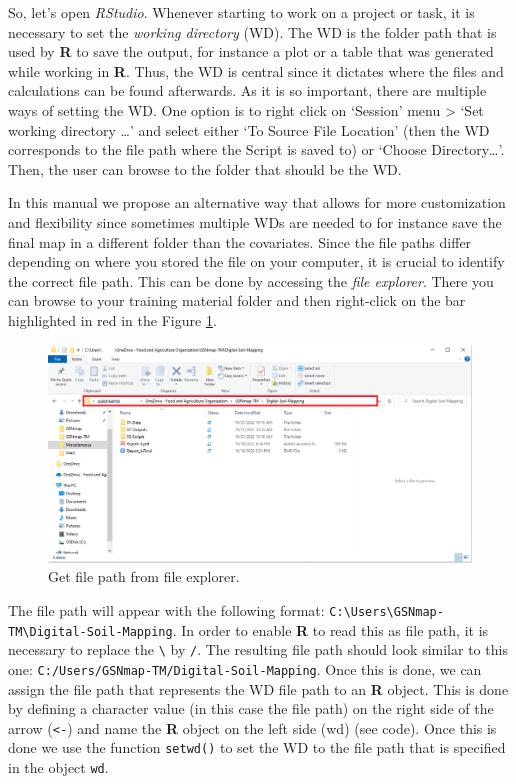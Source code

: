 \documentclass[
  10pt,
  b5paper,
  oneside]{book}
\begin{document}
So, let's open \emph{RStudio}. Whenever starting to work on a project or task, it is necessary to set the \emph{working directory} (WD). The WD is the folder path that is used by \textbf{R} to save the output, for instance a plot or a table that was generated while working in \textbf{R}. Thus, the WD is central since it dictates where the files and calculations can be found afterwards. As it is so important, there are multiple ways of setting the WD.
One option is to right click on `Session' menu \textgreater{} `Set working directory \ldots{}' and select either `To Source File Location' (then the WD corresponds to the file path where the Script is saved to) or `Choose Directory\ldots{}'. Then, the user can browse to the folder that should be the WD.

In this manual we propose an alternative way that allows for more customization and flexibility since sometimes multiple WDs are needed to for instance save the final map in a different folder than the covariates. Since the file paths differ depending on where you stored the file on your computer, it is crucial to identify the correct file path. This can be done by accessing the \emph{file explorer}. There you can browse to your training material folder and then right-click on the bar highlighted in red in the Figure \ref{fig:explorer}.

\begin{figure}
\includegraphics[width=17.42in]{images/file-explorer} \caption{Get file path from file explorer.}\label{fig:explorer}
\end{figure}

The file path will appear with the following format: \texttt{C:\textbackslash{}Users\textbackslash{}GSNmap-TM\textbackslash{}Digital-Soil-Mapping}. In order to enable \textbf{R} to read this as file path, it is necessary to replace the \texttt{\textbackslash{}} by \texttt{/}. The resulting file path should look similar to this one: \texttt{C:/Users/GSNmap-TM/Digital-Soil-Mapping}. Once this is done, we can assign the file path that represents the WD file path to an \textbf{R} object. This is done by defining a character value (in this case the file path) on the right side of the arrow (\texttt{\textless{}-}) and name the \textbf{R} object on the left side (wd) (see code). Once this is done we use the function \texttt{setwd()} to set the WD to the file path that is specified in the object \texttt{wd}.
\end{document}
